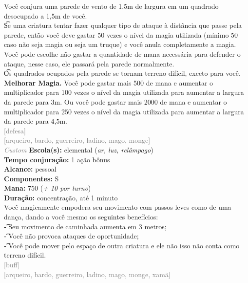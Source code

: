 \documentclass{RPG_Adventure}[2021/10/20]
\begin{document}
{\normalsize Você conjura uma parede de vento de 1,5m de largura em um quadrado desocupado a 1,5m de você.\\\t Se uma criatura tentar fazer qualquer tipo de ataque à distância que passe pela parede, então você deve gastar 50 vezes o nível da magia utilizada (mínimo 50 caso não seja magia ou seja um truque) e você anula completamente a magia. Você pode escolhe não gastar a quantidade de mana necessária para defender o ataque, nesse caso, ele passará pela parede normalmente.\\\t Os quadrados ocupados pela parede se tornam terreno difícil, exceto para você.\\\t \textbf{Melhorar Magia.} Você pode gastar mais 500 de mana e aumentar o multiplicador para 100 vezes o nível da magia utilizada para aumentar a largura da parede para 3m. Ou você pode gastar mais 2000 de mana e aumentar o multiplicador para 250 vezes o nível da magia utilizada para aumentar a largura da parede para 4,5m.\\}
{\scriptsize \textcolor{gray}{[defesa]\\}}
{\scriptsize \textcolor{gray}{[arqueiro, bardo, guerreiro, ladino, mago, monge]\\}}
{\tiny \textcolor{gray}{\textit{Custom}}}\jump{}
{\small \t \textbf{Escola(s):} elemental (\textit{ar, luz, relâmpago})\\\t \textbf{Tempo conjuração:} 1 ação bônus\\\t \textbf{Alcance:} pessoal\\\t \textbf{Componentes:} S\\\t \textbf{Mana:} 750 (\textit{+ 10 por turno})\\\t \textbf{Duração:} concentração, até 1 minuto\\}
{\normalsize Você magicamente empodera seu movimento com passos leves como de uma dança, dando a você mesmo os seguintes benefícios:\\\t - Seu movimento de caminhada aumenta em 3 metros;\\\t - Você não provoca ataques de oportunidade;\\\t - Você pode mover pelo espaço de outra criatura e ele não isso não conta como terreno difícil.\\}
{\scriptsize \textcolor{gray}{[buff]\\}}
{\scriptsize \textcolor{gray}{[arqueiro, bardo, guerreiro, ladino, mago, monge, xamã]\\}}
\end{document}
